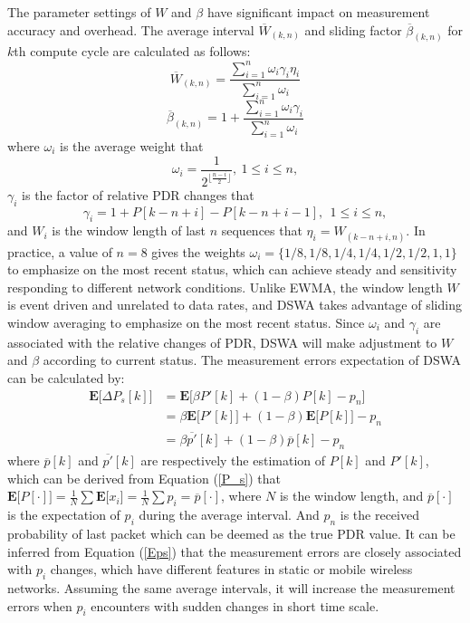 \documentclass[draftclsnofoot,journal,onecolumn,11pt]{IEEEtran}
\begin{document}
The parameter settings of $W$ and $\beta$ have significant impact on measurement accuracy and overhead. The average interval $\overline{W}_{(k,n)}$ and sliding factor $\overline{\beta}_{(k,n)}$ for $k$th compute cycle are calculated as follows:
\begin{equation}
  \overline{W}_{(k,n)} = \frac{\sum_{i=1}^n{\omega_i \gamma_i} \eta_{i}}{\sum_{i=1}^n{\omega_i}}
\label{W_s}
\end{equation}
\begin{equation}
  \overline{\beta}_{(k,n)} = 1 + \frac{\sum_{i=1}^n{\omega_i \gamma_i}}{\sum_{i=1}^n{\omega_i}}
\label{beta}
\end{equation}
where $\omega_i$ is the average weight that
\begin{equation}
  \omega_i = \frac{1}{2^{\lfloor\frac{n-i}{2}\rfloor}},~1\leq i \leq n,
\end{equation}
$\gamma_i$ is the factor of relative PDR changes that
\begin{equation}
  \gamma_i = 1 + P[k-n+i] - P[k-n+i-1],~~ 1 \leq i \leq n,
\label{gamma_i}
\end{equation}
and $W_i$ is the window length of last $n$ sequences that $\eta_i=W_{(k-n+i,n)}$. In practice, a value of $n=8$ gives the weights $\omega_i=\{1/8,1/8,1/4,1/4,1/2,1/2,1,1\}$ to emphasize on the most recent status, which can achieve steady and sensitivity responding to different network conditions. Unlike EWMA, the window length $W$ is event driven and unrelated to data rates, and DSWA takes advantage of sliding window averaging to emphasize on the most recent status. Since $\omega_i$ and $\gamma_i$ are associated with the relative changes of PDR, DSWA will make adjustment to $W$ and $\beta$ according to current status. The measurement errors expectation of DSWA can be calculated by:
\begin{equation}
\begin{split}
 \textbf{E[}\Delta P_s[k]\textbf{]}&=\textbf{E[}\beta P'[k]+(1-\beta)P[k]-p_{n}\textbf{]}\\
                                       &=\beta\textbf{E[}P'[k]\textbf{]}+(1-\beta)\textbf{E[}P[k]\textbf{]}-p_{n}\\
                                       &=\beta\overline{p'}[k]+(1-\beta)\overline{p}[k]-p_{n}
\end{split}
\label{Eps}
\end{equation}
where $\overline{p}[k]$ and $\overline{p'}[k]$ are respectively the estimation of $P[k]$ and $P'[k]$, which can be derived from Equation (\ref{P_s}) that $\textbf{E[}P[\cdot]\textbf{]}=\frac{1}{N}\sum\textbf{E[}x_i\textbf{]}=\frac{1}{N}\sum{p_i}=\overline{p}[\cdot]$, where $N$ is the window length, and $\overline{p}[\cdot]$ is the expectation of $p_i$ during the average interval. And $p_n$ is the received probability of last packet which can be deemed as the true PDR value. It can be inferred from Equation (\ref{Eps}) that the measurement errors are closely associated with $p_i$ changes, which have different features in static or mobile wireless networks. Assuming the same average intervals, it will increase the measurement errors when $p_i$ encounters with sudden changes in short time scale.
\end{document}
